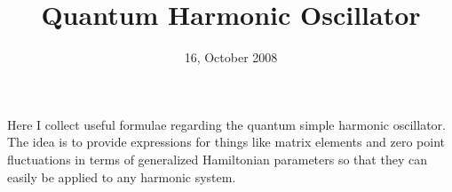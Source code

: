 \documentclass{article}
\title{Quantum Harmonic Oscillator}
\date{16, October 2008}
\begin{document}
\maketitle

Here I collect useful formulae regarding the quantum simple harmonic oscillator.
The idea is to provide expressions for things like matrix elements and zero point fluctuations in terms of generalized Hamiltonian parameters so that they can easily be applied to any harmonic system.







\end{document}
